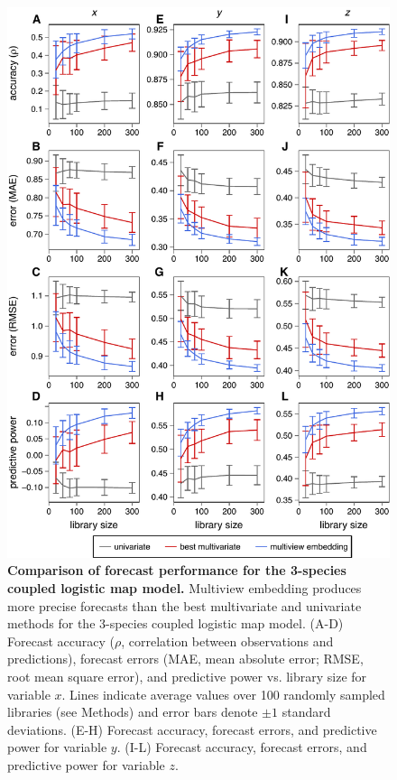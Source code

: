 \begin{figure}[!ht]
\begin{center}\includegraphics[scale = 0.65]{fig_multiembed_ed_1.pdf}\end{center}
\caption[Comparison of forecast performance for the 3-species coupled logistic map model.]{\textbf{Comparison of forecast performance for the 3-species coupled logistic map model.}\newline
Multiview embedding produces more precise forecasts than the best multivariate and univariate methods for the 3-species coupled logistic map model. (A-D) Forecast accuracy ($\rho$, correlation between observations and predictions), forecast errors (MAE, mean absolute error; RMSE, root mean square error), and predictive power vs. library size for variable $x$. Lines indicate average values over 100 randomly sampled libraries (see Methods) and error bars denote $\pm 1$ standard deviations. (E-H) Forecast accuracy, forecast errors, and predictive power for variable $y$. (I-L) Forecast accuracy, forecast errors, and predictive power for variable $z$.}
\label{fig_multiembed_ed_1}
\end{figure}

